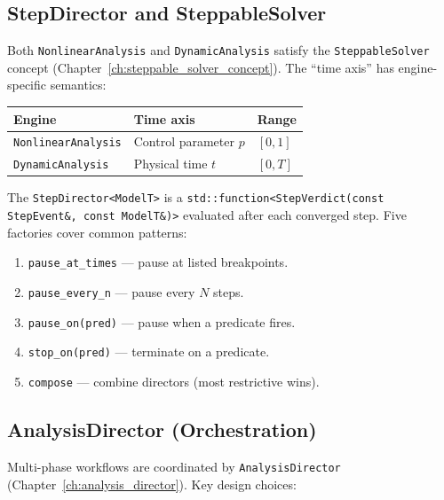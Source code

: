 \subsection{StepDirector and SteppableSolver}
\label{sec:arch:analysis:stepping}

Both \texttt{NonlinearAnalysis} and \texttt{DynamicAnalysis} satisfy the
\texttt{SteppableSolver} concept (Chapter~\ref{ch:steppable_solver_concept}).
The ``time axis'' has engine-specific semantics:

\begin{center}
\begin{tabular}{@{}lll@{}}
\toprule
\textbf{Engine} & \textbf{Time axis} & \textbf{Range} \\
\midrule
\texttt{NonlinearAnalysis} & Control parameter $p$ & $[0, 1]$ \\
\texttt{DynamicAnalysis}   & Physical time $t$     & $[0, T]$ \\
\bottomrule
\end{tabular}
\end{center}

The \texttt{StepDirector<ModelT>} is a
\texttt{std::function<StepVerdict(const StepEvent\&, const ModelT\&)>}
evaluated after each converged step.  Five factories cover common patterns:

\begin{enumerate}[nosep]
  \item \texttt{pause\_at\_times} --- pause at listed breakpoints.
  \item \texttt{pause\_every\_n} --- pause every $N$ steps.
  \item \texttt{pause\_on(pred)} --- pause when a predicate fires.
  \item \texttt{stop\_on(pred)} --- terminate on a predicate.
  \item \texttt{compose} --- combine directors (most restrictive wins).
\end{enumerate}


\subsection{AnalysisDirector (Orchestration)}
\label{sec:arch:analysis:director}

Multi-phase workflows are coordinated by \texttt{AnalysisDirector}
(Chapter~\ref{ch:analysis_director}).  Key design choices:


